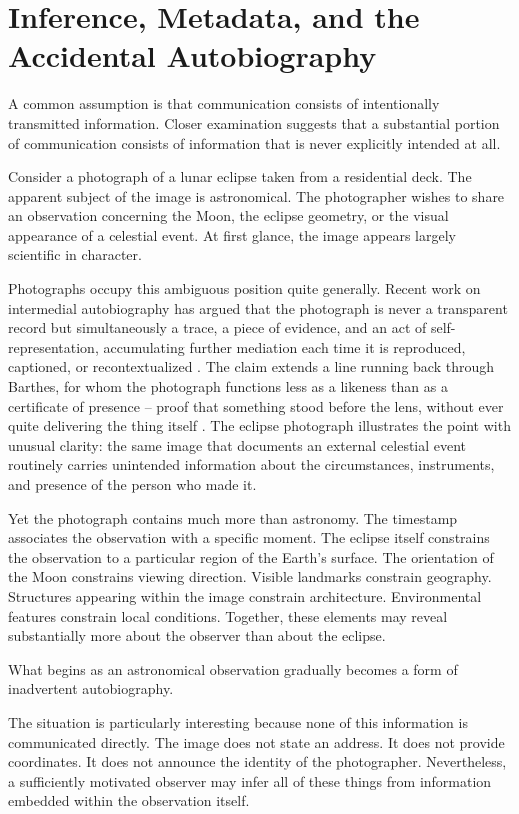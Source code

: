 \documentclass[11pt]{article}
\theoremstyle{plain}
\begin{document}
\section{Inference, Metadata, and the Accidental Autobiography}

A common assumption is that communication consists of intentionally transmitted information. Closer examination suggests that a substantial portion of communication consists of information that is never explicitly intended at all.

Consider a photograph of a lunar eclipse taken from a residential deck. The apparent subject of the image is astronomical. The photographer wishes to share an observation concerning the Moon, the eclipse geometry, or the visual appearance of a celestial event. At first glance, the image appears largely scientific in character.

Photographs occupy this ambiguous position quite generally. Recent work on intermedial autobiography has argued that the photograph is never a transparent record but simultaneously a trace, a piece of evidence, and an act of self-representation, accumulating further mediation each time it is reproduced, captioned, or recontextualized \cite{vanarsdall2015}. The claim extends a line running back through Barthes, for whom the photograph functions less as a likeness than as a certificate of presence -- proof that something stood before the lens, without ever quite delivering the thing itself \cite{barthes1981}. The eclipse photograph illustrates the point with unusual clarity: the same image that documents an external celestial event routinely carries unintended information about the circumstances, instruments, and presence of the person who made it.

Yet the photograph contains much more than astronomy. The timestamp associates the observation with a specific moment. The eclipse itself constrains the observation to a particular region of the Earth's surface. The orientation of the Moon constrains viewing direction. Visible landmarks constrain geography. Structures appearing within the image constrain architecture. Environmental features constrain local conditions. Together, these elements may reveal substantially more about the observer than about the eclipse.

What begins as an astronomical observation gradually becomes a form of inadvertent autobiography.

The situation is particularly interesting because none of this information is communicated directly. The image does not state an address. It does not provide coordinates. It does not announce the identity of the photographer. Nevertheless, a sufficiently motivated observer may infer all of these things from information embedded within the observation itself.
\end{document}
